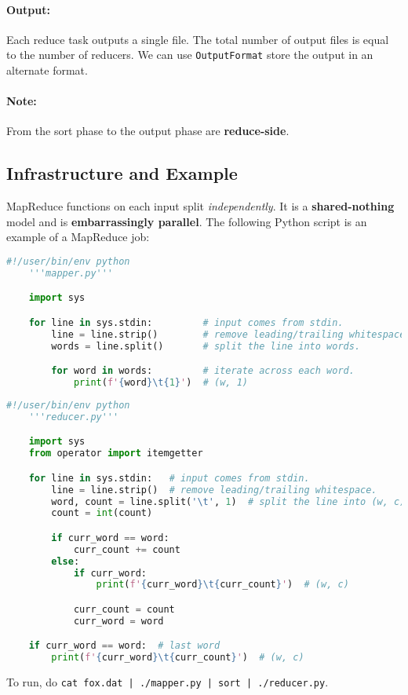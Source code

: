 \documentclass{report}
\renewcommand{\bf}[1]{\textbf{{#1}}}
\renewcommand{\tt}[1]{\texttt{{#1}}}
\renewcommand{\it}[1]{\textit{{#1}}}
\begin{document}
\paragraph{Output:}
Each reduce task outputs a single file. The total number of output files is
equal to the number of reducers. We can use \tt{OutputFormat} store the output
in an alternate format.

\paragraph{Note:} From the sort phase to the output phase are \bf{reduce-side}.

\subsection{Infrastructure and Example}
MapReduce functions on each input split \it{independently}. It is a
\bf{shared-nothing} model and is \bf{embarrassingly parallel}.
The following Python script is an example of a MapReduce job:
\begin{lstlisting}[language=Python, style=colorEX]
    #!/user/bin/env python
    '''mapper.py'''

    import sys

    for line in sys.stdin:         # input comes from stdin.
        line = line.strip()        # remove leading/trailing whitespace.
        words = line.split()       # split the line into words.

        for word in words:         # iterate across each word.
            print(f'{word}\t{1}')  # (w, 1)
\end{lstlisting}

\begin{lstlisting}[language=Python, style=colorEX]
    #!/user/bin/env python
    '''reducer.py'''

    import sys
    from operator import itemgetter

    for line in sys.stdin:   # input comes from stdin.
        line = line.strip()  # remove leading/trailing whitespace.
        word, count = line.split('\t', 1)  # split the line into (w, c)
        count = int(count)

        if curr_word == word:
            curr_count += count
        else:
            if curr_word:
                print(f'{curr_word}\t{curr_count}')  # (w, c)

            curr_count = count
            curr_word = word

    if curr_word == word:  # last word
        print(f'{curr_word}\t{curr_count}')  # (w, c)
\end{lstlisting}
To run, do \tt{cat fox.dat | ./mapper.py | sort | ./reducer.py}.
\end{document}
